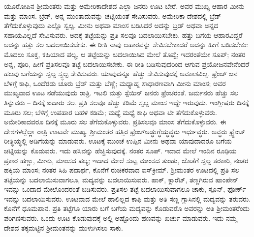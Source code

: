 ಯೂರೋಪಿನ ಶ‍್ರೀಮಂತರು ಮತ್ತು ಅಮೇರಿಕಾದೇಶದ ಎಲ್ಲಾ ಜನರು ಊಟ ಬೇರೆ. ಅವರ ಮುಖ್ಯ ಆಹಾರ ಮೀನು ಮತ್ತು ಮಾಂಸ. ಬ್ರೆಡ್​, ಅನ್ನ ಮುಂತಾದುವನ್ನು ಚಟ್ನಿಯಂತೆ ಸೇವಿಸುವರು. ಅಮೇರಿಕಾ ದೇಶದಲ್ಲಿ ಬ್ರೆಡ್​ ತೆಗೆದುಕೊಳ್ಳುವುದು ಎಲ್ಲೊ ಸ್ವಲ್ಪ. ಮೀನು ಅಥವಾ ಮಾಂಸ ಬಡಿಸಿದರೆ ಅದನ್ನು ಬ್ರಡ್​ ಅಥವಾ ಅನ್ನದ ಸಹಾಯವಿಲ್ಲದೆ ಸೇವಿಸುವರು. ಅದಕ್ಕೆ ತಟ್ಟೆಯನ್ನು ಪ್ರತಿ ಸಲವೂ ಬದಲಾಯಿಸಬೇಕು. ಹತ್ತು ಬಗೆಯ ಆಹಾರವಿದ್ದರೆ ಅದನ್ನು ಹತ್ತು ಸಲ ಬದಲಾಯಿಸಬೇಕು. ಈ ರೀತಿ ನಾವು ಆಹಾರವನ್ನು ಸೇವಿಸಬೇಕಾದರೆ ಅದನ್ನು ಹೀಗೆ ಬಡಿಸಬೇಕು: ಮೊದಲು ಸೂಕ್ತ, ಕಹಿಯಾದ ಪಲ್ಯ, ಆ ತಟ್ಟೆಯನ್ನು ಬದಲಾಯಿಸಿದ ಮೇಲೆ ತೊವ್ವೆ; ಇದರಂತೆಯೇ ಸೂಪ್​; ನಂತರ ಅನ್ನ, ಪೂರಿ, ಹೀಗೆ ಪ್ರತಿಸಲವೂ ತಟ್ಟೆ ಬದಲಾಯಿಸಬೇಕು. ಈ ರೀತಿ ಬಡಿಸುವುದರಿಂದ ಆಗುವ ಪ್ರಯೋಜನವೇನೆಂದರೆ ಹಲವು ಬಗೆಯನ್ನು ಸ್ವಲ್ಪ ಸ್ವ್ಧಲ್ಪ ಸೇವಿಸುವರು. ಯಾವುದನ್ನೂ ಹೆಚ್ಚು ಸೇವಿಸುವುದಕ್ಕೆ ಅವಕಾಶವಿಲ್ಲ. ಫ್ರೆಂಚ್​ ಜನ ಬೆಳಗ್ಗೆ ಕಾಫಿ, ಒಂದೆರಡು ಚೂರು ಬ್ರೆಡ್​ ಮತ್ತು ಬೆಣ್ಣೆ; ಮಧ್ಯಾಹ್ನ ಸಾಧಾರಣವಾಗಿ ಮೀನು ಮಾಂಸ; ಅವರ ಮುಖ್ಯವಾದ ಊಟ ನಡೆಯುವುದು ರಾತ್ರಿ. ಇಟಲಿ ಮತ್ತು ಸ್ಪೆಯಿನ್​ ಜನರು ಫ್ರೆಂಚರಂತೆ. ಜರ್ಮನರು ಹೆಚ್ಚು ಸಲ ತಿನ್ನುವರು – ದಿನಕ್ಕೆ ಐದಾರು ಸಲ. ಪ್ರತಿ ಸಲವೂ ಹೆಚ್ಚು ಕಡಿಮೆ ಸ್ವಲ್ಪ ಮಾಂಸ ಇದ್ದೇ ಇರುವುದು. ಇಂಗ್ಲೀಷರು ದಿನಕ್ಕೆ ಮೂರು ಸಲ; ಬೆಳಿಗ್ಗೆ ಉಪಹಾರ ಬಹಳ ಕಡಿಮೆ; ಮಧ್ಯೆ ಮಧ್ಯೆ ಕಾಫಿ ಅಥವಾ ಟೀ ತೆಗೆದುಕೊಳ್ಳುವರು. ಅಮೇರಿಕಾದವರೂ ದಿನಕ್ಕೆ ಮೂರು ಸಲ ತೆಗೆದುಕೊಳ್ಳುವರು. ಪ್ರತಿಸಲವೂ ಮಾಂಸ ತೆಗೆದುಕೊಳ್ಳುವರು. ಈ ದೇಶಗಳಲ್ಲೆಲ್ಲಾ ರಾತ್ರಿ ಊಟವೇ ಮುಖ್ಯ. ಶ‍್ರೀಮಂತರ ಹತ್ತಿರ ಫ್ರೆಂಚ್​ ಅಡ್ಧುಗ್ಧೆಯ್ಧವ್ಧರು ಇರ್ಧುವ್ಧರು. ಅವ್ಧರು ಫ್ರ್ಧೆಂಚ್​ ರೀತ್ಧಿಯ್ಧಲ್ಲಿ ಅಡಿಗೆಯನ್ನು ಮಾಡುವರು. ಊಟಕ್ಕೆ ಮುಂಚೆ ಉಪ್ಪಿನ ಮೀನು ಅಥವಾ ಯಾವುದಾದರೂ ಬಗೆಯ ಚಟ್ನಿಯನ್ನು ಕೊಡುವರು. ಇದು ಹಸಿವನ್ನು ಹೆಚ್ಚಿಸುವುದಕ್ಕೆ. ನಂತರ ಸೂಪ್​. ಇದಾದ ಮೇಲೆ ಇಂದಿನ ರೂಢಿಯ ಪ್ರಕಾರ ಹಣ್ಣು, ಮೀನು, ಮಾಂಸದ ಪಲ್ಯ; ಇದಾದ ಮೇಲೆ ಸುಟ್ಟ ಮಾಂಸದ ತುಂಡು, ಜೊತೆಗೆ ಸ್ವಲ್ಪ ತರಕಾರಿ, ನಂತರ ಹಕ್ಕಿಯ ಮಾಂಸ; ನಂತರ ಸಿಹಿ ಪದಾರ್ಥ, ಕೊನೆಗೆ ರುಚಿಕರವಾದ ಐಸ್​ಕ್ರೀಮ್​. ಶ‍್ರೀಮಂತರ ಊಟದಲ್ಲಿ ಪ್ರತಿ ಸಲ ತಟ್ಟೆಯನ್ನು ಬದಲಾಯಿಸುವಾಗಲೂ, ಮದ್ಯವನ್ನು ಬದಲಾಯಿಸುವರು. ಹಾಕ್​, ಕ್ಲಾರೆಟ್​, ತಣ್ಣಗಿರುವ ಷಾಂಪೇನ್​ ಇವನ್ನು ಒಂದಾದ ಮೇಲೊಂದರಂತೆ ಬಡಿಸುವರು. ಪ್ರತಿಸಲ ತಟ್ಟೆ ಬದಲಾಯಿಸುವಾಗಲೂ ಚಾಕು, ಸ್ಪೂನ್​, ಫೋರ್ಕ್​ ಇವನ್ನು ಬದಲಾಯಿಸುವರು. ಊಟವಾದ ಮೇಲೆ ಹಾಲಿಲ್ಲದ ಕಾಫಿ ಮತ್ತು ಅತಿ ಸಣ್ಣ ಗ್ಲಾಸಿನಲ್ಲಿ ಮದ್ಯವನ್ನು ತರುವರು. ಕೊನೆಗೆ ಧೂಮಪಾನ. ಪ್ರತಿ ತಟ್ಟೆಗೂ ಯಾರು ಬಗೆ ಬಗೆಯ ಮದ್ಯವನ್ನು ಕೊಡುವರೊ ಅವರನ್ನು ಅತಿ ಶ‍್ರೀಮಂತರೆಂದು ಪರಿಗಣಿಸುವರು. ಒಂದು ಊಟ ಕೊಡುವುದಕ್ಕೆ ಅಲ್ಲಿ ಅಷ್ಟೊಂದು ಹಣವನ್ನು ಖರ್ಚು ಮಾಡುವರು. ಇದು ನಮ್ಮ ದೇಶದ ತಕ್ಕಮಟ್ಟಿನ ಶ‍್ರೀಮಂತನನ್ನು ಮುಳುಗಿಸಲು ಸಾಕು.

